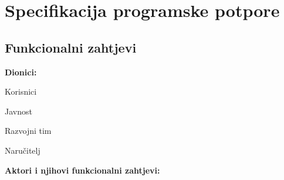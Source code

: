 
\chapter{Specifikacija programske potpore}

\section{Funkcionalni zahtjevi}

\noindent \textbf{Dionici:}

\begin{packed_enum}
	
	\item Korisnici	
	\item Javnost	
	\item Razvojni tim
	\item Naručitelj
	
\end{packed_enum}

\noindent \textbf{Aktori i njihovi funkcionalni zahtjevi:}


